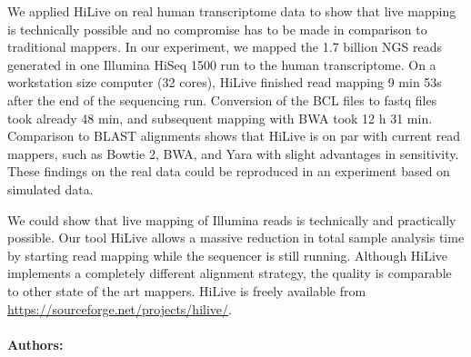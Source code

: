 We applied HiLive on real human transcriptome data to show that live mapping is technically possible
and no compromise has to be made in comparison to traditional mappers. In our experiment, we
mapped the 1.7 billion NGS reads generated in one Illumina HiSeq 1500 run to the human
transcriptome. On a workstation size computer (32 cores), HiLive finished read mapping 9 min 53s
after the end of the sequencing run. Conversion of the BCL files to fastq files took already 48 min,
and subsequent mapping with BWA took 12 h 31 min. Comparison to BLAST alignments shows that
HiLive is on par with current read mappers, such as Bowtie 2, BWA, and Yara with slight advantages
in sensitivity. These findings on the real data could be reproduced in an experiment based on
simulated data.

We could show that live mapping of Illumina reads is technically and practically possible. Our tool
HiLive allows a massive reduction in total sample analysis time by starting read mapping while the
sequencer is still running. Although HiLive implements a completely different alignment strategy, the
quality is comparable to other state of the art mappers.
HiLive is freely available from \url{https://sourceforge.net/projects/hilive/}.


\noindent \paragraph{Authors:} 

